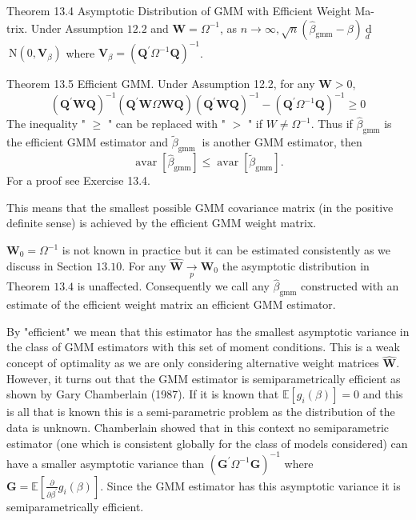 \documentclass[10pt]{article}
\begin{document}
Theorem 13.4 Asymptotic Distribution of GMM with Efficient Weight Ma-\\
trix. Under Assumption $12.2$ and $\boldsymbol{W}=\Omega^{-1}$, as $n \rightarrow \infty, \sqrt{n}\left(\widehat{\beta}_{\mathrm{gmm}}-\beta\right) \underset{d}{\mathrm{~d}}$\\
$\mathrm{~N}\left(0, \boldsymbol{V}_{\beta}\right)$ where $\boldsymbol{V}_{\beta}=\left(\boldsymbol{Q}^{\prime} \Omega^{-1} \boldsymbol{Q}\right)^{-1}$.

Theorem 13.5 Efficient GMM. Under Assumption 12.2, for any $\boldsymbol{W}>0$,
$$
\left(\boldsymbol{Q}^{\prime} \boldsymbol{W} \boldsymbol{Q}\right)^{-1}\left(\boldsymbol{Q}^{\prime} \boldsymbol{W} \Omega \boldsymbol{W} \boldsymbol{Q}\right)\left(\boldsymbol{Q}^{\prime} \boldsymbol{W} \boldsymbol{Q}\right)^{-1}-\left(\boldsymbol{Q}^{\prime} \Omega^{-1} \boldsymbol{Q}\right)^{-1} \geq 0
$$
The inequality " $\geq$ " can be replaced with " $>$ " if $W \neq \Omega^{-1}$. Thus if $\widehat{\beta}_{\mathrm{gmm}}$ is the efficient GMM estimator and $\widetilde{\beta}_{\text {gmm }}$ is another GMM estimator, then
$$
\operatorname{avar}\left[\widehat{\beta}_{\mathrm{gmm}}\right] \leq \operatorname{avar}\left[\widetilde{\beta}_{\mathrm{gmm}}\right] .
$$
For a proof see Exercise 13.4.

This means that the smallest possible GMM covariance matrix (in the positive definite sense) is achieved by the efficient GMM weight matrix.

$\boldsymbol{W}_{0}=\Omega^{-1}$ is not known in practice but it can be estimated consistently as we discuss in Section $13.10 .$ For any $\widehat{\boldsymbol{W}} \underset{p}{\rightarrow} \boldsymbol{W}_{0}$ the asymptotic distribution in Theorem $13.4$ is unaffected. Consequently we call any $\widehat{\beta}_{\mathrm{gmm}}$ constructed with an estimate of the efficient weight matrix an efficient GMM estimator.

By "efficient" we mean that this estimator has the smallest asymptotic variance in the class of GMM estimators with this set of moment conditions. This is a weak concept of optimality as we are only considering alternative weight matrices $\widehat{\boldsymbol{W}}$. However, it turns out that the GMM estimator is semiparametrically efficient as shown by Gary Chamberlain (1987). If it is known that $\mathbb{E}\left[g_{i}(\beta)\right]=0$ and this is all that is known this is a semi-parametric problem as the distribution of the data is unknown. Chamberlain showed that in this context no semiparametric estimator (one which is consistent globally for the class of models considered) can have a smaller asymptotic variance than $\left(\boldsymbol{G}^{\prime} \Omega^{-1} \boldsymbol{G}\right)^{-1}$ where $\boldsymbol{G}=\mathbb{E}\left[\frac{\partial}{\partial \beta^{\prime}} g_{i}(\beta)\right]$. Since the GMM estimator has this asymptotic variance it is semiparametrically efficient.
\end{document}
